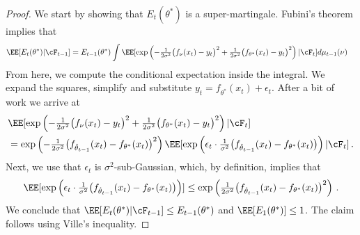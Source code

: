 \begin{proof}
We start by showing that $E_t(\theta^*)$ is a super-martingale. Fubini's theorem implies that
\begin{align*}
    \EE[E_t(\theta^*)|\cF_{t-1}] &= E_{t-1}(\theta^*) \int \EE[\exp\left( - \tfrac{1}{2\sigma^2} \big(f_\nu(x_t) - y_t\big)^2 + \tfrac{1}{2\sigma^2} \big(f_{\theta^*}(x_t) - y_t\big)^2 \right) |\cF_t ]  d \mu_{t-1}(\nu)%
\end{align*}
From here, we compute the conditional expectation inside the integral. We expand the squares, simplify and substitute $y_t = f_{\theta^*}(x_t) + \epsilon_t$. After a bit of work we arrive at 
\begin{align*}
    &\EE[\exp\left( - \tfrac{1}{2\sigma^2} \big(f_\nu(x_t) - y_t\big)^2 + \tfrac{1}{2\sigma^2} \big(f_{\theta^*}(x_t) - y_t\big)^2 \right) |\cF_t ] \\
    &= \exp\left(- \tfrac{1}{2\sigma^2} \big(f_{\hat \theta_{t-1}}(x_t) - f_{\theta^*}(x_t)\big)^2 \right) \EE[\exp\left( \epsilon_t \cdot \tfrac{1}{\sigma^2} \big(f_{\hat \theta_{t-1}}(x_t) - f_{\theta^*}(x_t)\big) \right) |\cF_t] \,.
\end{align*}
Next, we use that $\epsilon_t$ is $\sigma^2$-sub-Gaussian, which, by definition, implies that 
\begin{align*}
    \EE[\exp\left( \epsilon_t \cdot \tfrac{1}{\sigma^2} \big(f_{\hat \theta_{t-1}}(x_t) - f_{\theta^*}(x_t)\big) \right) ] \leq \exp\left(\tfrac{1}{2\sigma^2} \big(f_{\hat \theta_{t-1}}(x_t) - f_{\theta^*}(x_t)\big)^2 \right) \,.
\end{align*}
We conclude that $\EE[E_t(\theta^*)|\cF_{t-1}] \leq  E_{t-1}(\theta^*)$ and $\EE[E_1(\theta^*)] \leq 1$. The claim follows using Ville's inequality.
\end{proof}


